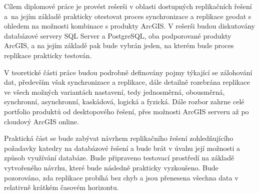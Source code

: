 Cílem diplomové práce je provést rešerši v oblasti dostupných replikačních řešení a~na jejím základě prakticky otestovat proces synchronizace a replikace geodat s ohledem na možnosti kombinace s produkty ArcGIS. V rešerši budou diskutovány databázové servery SQL Server a PostgreSQL, oba podporované produkty ArcGIS, a na jejím základě pak bude vybrán jeden, na kterém bude proces replikace prakticky testován.

V teoretické části práce budou podrobně definovány pojmy týkající se zálohování dat, především však synchronizace a replikace, dále detailně rozebrána replikace ve všech možných variantách nastavení, tedy jednosměrná, obousměrná, synchronní, asynchronní, kaskádová, logická a fyzická. Dále rozbor zahrne celé portfolio produktů od desktopového řešení, přes možnosti ArcGIS serveru až po cloudový ArcGIS online.

Praktická část se bude zabývat návrhem replikačního řešení zohledňujícího požadavky katedry na databázové řešení a bude brát v úvahu její možnosti a způsob využívání databáze. Bude připraveno testovací prostředí na základě vytvořeného návrhu, které bude následně prakticky vyzkoušeno. Bude pozorováno, zda replikace probíhá bez chyb a jsou přenesena všechna data v relativně krátkém časovém horizontu. 


